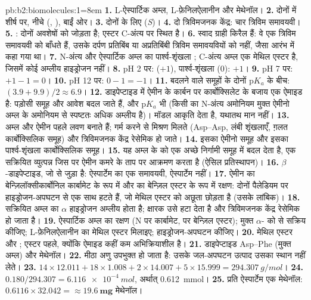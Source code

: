 \begin{solution}{pb:b2:biomolecules:1}\emergencystretch=8em
\textbf{1.} L-ऐस्पार्टिक अम्ल, L-फ़ेनिलऐलानीन और मेथेनॉल।
\textbf{2.} दोनों में  शीर्ष पर,  नीचे (, ), 
बाईं ओर।
\textbf{3.} दोनों के लिए (\textit{S})।
\textbf{4.} दो त्रिविमजनक केंद्र: चार त्रिविम समावयवी।
\textbf{5.} :  दोनों
अवशेषों को जोड़ता है; एस्टर C-अंत्य पर स्थित  है।
\textbf{6.} स्वाद ग्राही किरैल हैं: वे एक त्रिविम समावयवी को बाँधते हैं, उसके दर्पण प्रतिबिंब या
अप्रतिबिंबी त्रिविम समावयवियों को नहीं, जैसा आरंभ में कहा गया था।
\textbf{7.} N-अंत्य  और ऐस्पार्टिक अम्ल का पार्श्व-शृंखला ; C-अंत्य अम्ल
एक मेथिल एस्टर है, जिसमें कोई अम्लीय हाइड्रोजन नहीं।
\textbf{8.} pH 2 पर:  ($+1$), पार्श्व-शृंखला  (0): $+1$।
\textbf{9.} pH 7 पर: $+1 - 1 = 0$।
\textbf{10.} pH 12 पर: $0 - 1 = -1$।
\textbf{11.} बदलने वाले समूहों के दोनों $\mathrm pK_a$ के बीच: $(3.9 + 9.9)/2 \approx 6.9$।
\textbf{12.} डाइपेप्टाइड में ऐमीन के कार्बन पर कार्बोक्सिलेट के बजाय एक ऐमाइड है: पड़ोसी
समूह और आवेश बदल जाते हैं, और $\mathrm pK_a$ भी (किसी  का N-अंत्य अमोनियम
मुक्त ऐमीनो अम्ल के अमोनियम से स्पष्टतः अधिक अम्लीय है)। मॉडल आकृति देता है, यथातथ
मान नहीं।
\textbf{13.} अम्ल और ऐमीन पहले लवण बनाते हैं; गर्म करने से मिश्रण मिलते (Asp--Asp, लंबी शृंखलाएँ,
ग़लत कार्बोक्सिलिक समूह) और त्रिविमजनक केंद्र रेसेमिक हो जाते।
\textbf{14.} इसका ऐमीनो समूह और इसका पार्श्व-शृंखला कार्बोक्सिलिक समूह।
\textbf{15.} यह अम्ल के  को एक अच्छे निर्गामी समूह में बदल देता है, एक सक्रियित व्युत्पन्न जिस पर
ऐमीन कमरे के ताप पर आक्रमण करता है (ऐसिल प्रतिस्थापन)।
\textbf{16.} $\beta$-डाइपेप्टाइड, जो  से जुड़ा है: ऐस्पार्टेम का एक समावयवी, ऐस्पार्टेम नहीं।
\textbf{17.} ऐमीन का बेन्ज़िलॉक्सीकार्बोनिल कार्बामेट के रूप में और  का बेन्ज़िल एस्टर के रूप में रक्षण: दोनों
पैलेडियम पर हाइड्रोजन-अपघटन से एक साथ हटते हैं, जो मेथिल एस्टर को अछूता छोड़ता है (उसके
लांबिक)।
\textbf{18.} सक्रियित अम्ल का $\alpha$ हाइड्रोजन अम्लीय होता है; क्षारक उसे हटा देता है और त्रिविमजनक केंद्र
रेसेमिक हो जाता है।
\textbf{19.} ऐस्पार्टिक अम्ल का रक्षण (N पर कार्बामेट,  पर बेन्ज़िल एस्टर); मुक्त
$\alpha$- को  से सक्रिय कीजिए; L-फ़ेनिलऐलानीन का मेथिल एस्टर मिलाइए; हाइड्रोजन-अपघटन कीजिए।
\textbf{20.} मेथिल एस्टर और ; एस्टर पहले, क्योंकि ऐमाइड कहीं कम अभिक्रियाशील है।
\textbf{21.} डाइपेप्टाइड Asp--Phe (मुक्त अम्ल) और मेथेनॉल।
\textbf{22.} मीठा अणु उपभुक्त हो जाता है: उसके जल-अपघटन उत्पाद उसका स्थान नहीं लेते।
\textbf{23.} $14 \times 12.011 + 18 \times 1.008 + 2 \times 14.007 + 5 \times 15.999 =
\qty{294.307}{g/mol}$।
\textbf{24.} $0.180/294.307 = \qty{6.116e-4}{mol}$, अर्थात् \qty{0.612}{mmol}।
\textbf{25.} प्रति ऐस्पार्टेम एक मेथेनॉल: $0.6116 \times 32.042 = \boldsymbol{\approx \qty{19.6}{mg}}$
मेथेनॉल।
\end{solution}
